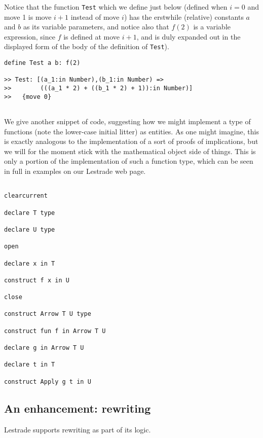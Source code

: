 \documentclass{article}
\begin{document}
 Notice that the function {\tt Test} which we define just below (defined when $i=0$ and move 1 is move $i+1$ instead of move $i$) has the erstwhile (relative) constants $a$ and $b$ as its variable parameters, and notice also that $f(2)$ is a variable expression, since $f$ is defined at move $i+1$, and is duly expanded out in the displayed form of the body of the definition of {\tt Test}).

\begin{verbatim}
define Test a b: f(2)

>> Test: [(a_1:in Number),(b_1:in Number) => 
>>        (((a_1 * 2) + ((b_1 * 2) + 1)):in Number)]
>>   {move 0}


\end{verbatim}

 We give another snippet of code, suggesting how we might implement a type of functions (note the lower-case initial litter) as entities.  As one might imagine, this is exactly analogous to the implementation of a sort of proofs of implications, but we will for the moment stick with the mathematical object side of things.  This is only a portion of the implementation of such a function type, which can be seen in full in examples on our Lestrade web page.
\begin{verbatim}

clearcurrent

declare T type

declare U type

open

declare x in T

construct f x in U

close

construct Arrow T U type

construct fun f in Arrow T U

declare g in Arrow T U

declare t in T

construct Apply g t in U

\end{verbatim}

\subsection{An enhancement: rewriting}

Lestrade supports rewriting as part of its logic.
\end{document}
